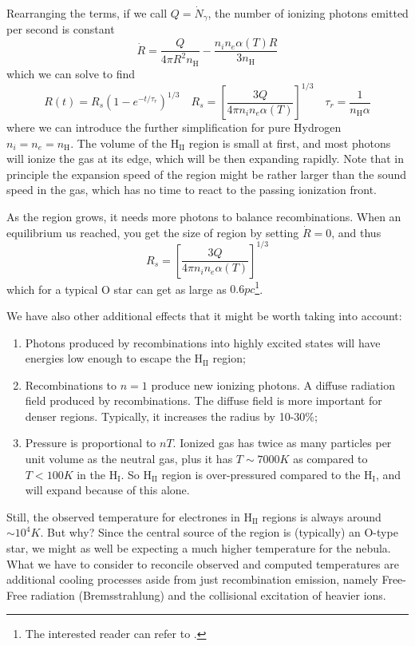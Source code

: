 Rearranging the terms, if we call $Q = \dot{N}_{\gamma}$, the number of ionizing photons emitted per second is constant
\begin{equation*}
    \dot{R} = \frac{Q}{4\pi R^{2}n_{\text{H}}}-\frac{n_{i}n_{e}\alpha(T)R}{3n_{\text{H}}}
\end{equation*}
which we can solve to find 
\begin{equation}
    R(t) = R_{s}\left(1-e^{-t/\tau_{r}}\right)^{1/3} \quad R_{s} = \left[\frac{3Q}{4\pi n_{i}n_{e}\alpha(T)}\right]^{1/3} \quad \tau_{r} = \frac{1}{n_{\text{H}}\alpha}
    \label{eq:stromgrenradius}
\end{equation}
where we can introduce the further simplification for pure Hydrogen $n_{i} = n_{e} = n_{\text{H}}$. The volume of the H$_{\text{II}}$ region is small at first, and most photons will ionize the gas at its edge, which will be then expanding rapidly. Note that in principle the expansion speed of the region might be rather larger than the sound speed in the gas, which has no time to react to the passing ionization front.
\par As the region grows, it needs more photons to balance recombinations. When an equilibrium us reached, you get the size of region by setting $\dot{R} = 0$, and thus
\begin{equation*}
    R_{s} = \left[\frac{3Q}{4\pi n_{i}n_{e}\alpha(T)}\right]^{1/3}
\end{equation*}
which for a typical O star can get as large as $0.6\unit{pc}$\footnote{The interested reader can refer to \cite{2006agna.book.....O}.}.
\par We have also other additional effects that it might be worth taking into account:
\begin{enumerate}
    \item Photons produced by recombinations into highly excited states will have energies low enough to escape the H$_{\text{II}}$ region;
    \item Recombinations to $n = 1$ produce new ionizing photons. A diffuse radiation field produced by recombinations. The diffuse field is more important for denser regions. Typically, it increases the radius by 10-30\%;
    \item Pressure is proportional to $nT$. Ionized gas has twice as many particles per unit volume as the neutral gas, plus it has $T\sim 7000\unit{K}$ as compared to $T<100\unit{K}$ in the H$_{\text{I}}$. So H$_{\text{II}}$ region is over-pressured compared to the H$_{\text{I}}$, and will expand because of this alone.
\end{enumerate}
Still, the observed temperature for electrones in H$_{\text{II}}$ regions is always around $\sim 10^{4}\unit{K}$. But why? Since the central source of the region is (typically) an O-type star, we might as well be expecting a much higher temperature for the nebula. What we have to consider to reconcile observed and computed temperatures are additional cooling processes aside from just recombination emission, namely Free-Free radiation (Bremsstrahlung) and the collisional excitation of heavier ions.

